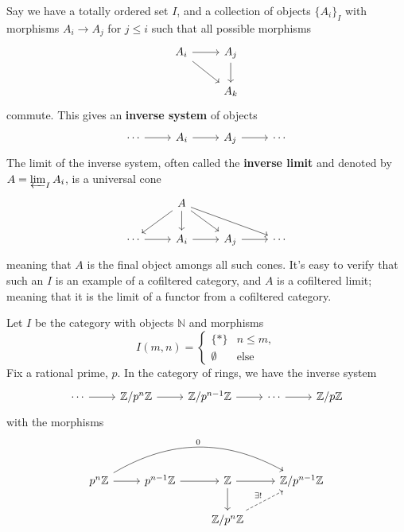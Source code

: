 \documentclass[reqno, 12pt]{amsart}
\begin{document}
Say we have a totally ordered set $I$, and a collection of objects $\{A_i\}_I$ with morphisms $A_i \to A_j$ for $j \leq i$ such that all possible morphisms
$$\begin{tikzcd}
  A_i \arrow{r}\arrow{rd} & A_j \arrow{d}\\
  & A_k
\end{tikzcd}$$
commute.
This gives an \textbf{inverse system} of objects
$$\begin{tikzcd}
  \cdots \arrow{r} & A_{i} \arrow{r} & A_{j} \arrow{r} & \cdots
\end{tikzcd}$$
The limit of the inverse system, often called the \textbf{inverse limit} and denoted by $A = \varprojlim_I A_i$, is a universal cone
$$\begin{tikzcd}
  & A \arrow{d}\arrow{rd}\arrow{ld}\arrow{rrd}\\
  \cdots \arrow{r} & A_{i} \arrow{r} & A_{j} \arrow{r} & \cdots
\end{tikzcd}$$
meaning that $A$ is the final object amongs all such cones.
It's easy to verify that such an $I$ is an example of a cofiltered category, and $A$ is a cofiltered limit; meaning that it is the limit of a functor from a cofiltered category.

\begin{example}
  Let $I$ be the category with objects $\mathbb{N}$ and morphisms
  $$I(m,n) = \left\{
  \begin{array}{ll}
    \{\ast\} & n \leq m,\\
    \emptyset & \text{else}
  \end{array}
  \right.$$
  Fix a rational prime, $p$.
  In the category of rings, we have the inverse system
  $$\begin{tikzcd}
    \cdots \arrow{r} & \Z/p^n\Z \arrow{r} & \Z/p^{n-1}\Z \arrow{r} & \cdots \arrow{r} & \Z/p\Z
  \end{tikzcd}$$
  with the morphisms
  $$\begin{tikzcd}
    p^{n}\Z \arrow{r}\arrow[bend left]{rrr}{0} & p^{n-1}\Z \arrow{r} & \Z \arrow{d}\arrow{r} & \Z/p^{n-1}\Z\\
    & & \Z/p^{n}\Z \arrow[dashed]{ur}{\exists !}
  \end{tikzcd}$$
\end{example}


\end{document}
